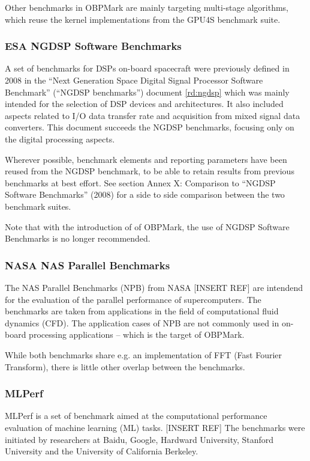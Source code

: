 Other benchmarks in OBPMark are mainly targeting multi-stage algorithms, which reuse the kernel implementations from the GPU4S benchmark suite. 

\subsubsection{ESA NGDSP Software Benchmarks}
A set of benchmarks for DSPs on-board spacecraft were previously defined in 2008 in the “Next Generation Space Digital Signal Processor Software Benchmark” (“NGDSP benchmarks”) document \ref{rd:ngdsp} which was mainly intended for the selection of DSP devices and architectures. It also included aspects related to I/O data transfer rate and acquisition from mixed signal data converters. This document succeeds the NGDSP benchmarks, focusing only on the digital processing aspects. 

Wherever possible, benchmark elements and reporting parameters have been reused from the NGDSP benchmark, to be able to retain results from previous benchmarks at best effort. See section Annex X: Comparison to “NGDSP Software Benchmarks” (2008) for a side to side comparison between the two benchmark suites.

Note that with the introduction of of OBPMark, the use of NGDSP Software Benchmarks is no longer recommended.

\subsubsection{NASA NAS Parallel Benchmarks}
The NAS Parallel Benchmarks (NPB) from NASA [INSERT REF] are intendend for the evaluation of the parallel performance of supercomputers. The benchmarks are taken from applications in the field of computational fluid dynamics (CFD). The application cases of NPB are not commonly used in on-board processing applications -- which is the target of OBPMark. 

While both benchmarks share e.g. an implementation of FFT (Fast Fourier Transform), there is little other overlap between the benchmarks.

\subsubsection{MLPerf}
MLPerf is a set of benchmark aimed at the computational performance evaluation of machine learning (ML) tasks. [INSERT REF] The benchmarks were initiated by researchers at Baidu, Google, Hardward University, Stanford University and the University of California Berkeley. 

